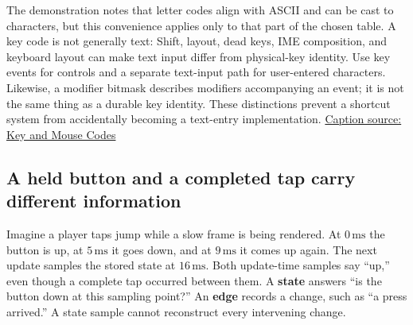 The demonstration notes that letter codes align with ASCII and can be cast to characters, but this convenience applies only to that part of the chosen table. A key code is not generally text: Shift, layout, dead keys, IME composition, and keyboard layout can make text input differ from physical-key identity. Use key events for controls and a separate text-input path for user-entered characters. Likewise, a modifier bitmask describes modifiers accompanying an event; it is not the same thing as a durable key identity. These distinctions prevent a shortcut system from accidentally becoming a text-entry implementation. \href{https://www.youtube.com/watch?v=zaJGn8pur5I}{Caption source: Key and Mouse Codes}

\subsection{A held button and a completed tap carry different information}\label{05-engine-i-ch014-a-held-button-and-a-completed-tap-carry-different-information}

\hypertarget{05-engine-i-ch014-a-held-button-and-a-completed-tap-carry-different-information}{}

Imagine a player taps jump while a slow frame is being rendered. At \(0\,\mathrm{ms}\) the button is up, at \(5\,\mathrm{ms}\) it goes down, and at \(9\,\mathrm{ms}\) it comes up again. The next update samples the stored state at \(16\,\mathrm{ms}\). Both update-time samples say ``up,'' even though a complete tap occurred between them. A \textbf{state} answers ``is the button down at this sampling point?'' An \textbf{edge} records a change, such as ``a press arrived.'' A state sample cannot reconstruct every intervening change.

